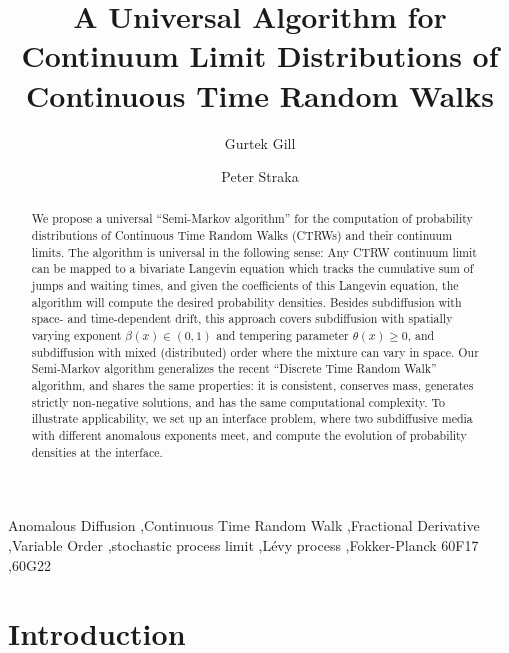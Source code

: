 \documentclass[a4paper,12pt]{elsarticle}
\numberwithin{equation}{section}
\theoremstyle{plain}
\theoremstyle{definition}
\theoremstyle{remark}
\numberwithin{equation}{section}
\newcommand{\1}{\mathbf 1}
\begin{document}
\begin{frontmatter}

\title{A Universal Algorithm for Continuum Limit Distributions of
Continuous Time Random Walks}
\author[UNSW]{Gurtek Gill}
\author[UNSW]{Peter Straka}
\address[UNSW]{School of Mathematics \& Statistics, UNSW Sydney}

\begin{abstract}
We propose a universal ``Semi-Markov algorithm'' for the computation of
probability distributions of Continuous Time Random Walks (CTRWs) and their
continuum limits.
The algorithm is universal in the following sense: Any CTRW continuum limit
can be mapped to a bivariate Langevin equation which tracks the cumulative sum
of jumps and waiting times, and given the coefficients of this Langevin
equation, the algorithm will compute the desired probability densities.
Besides subdiffusion with space- and time-dependent drift, this approach
covers subdiffusion with spatially varying exponent $\beta(x) \in (0,1)$ and
tempering parameter $\theta(x) \ge 0$, and subdiffusion with mixed (distributed)
order where the mixture can vary in space.
Our Semi-Markov algorithm generalizes the recent
``Discrete Time Random Walk'' algorithm, and shares the same properties:
it is consistent, conserves mass, generates strictly non-negative solutions,
and has the same computational complexity.
To illustrate applicability, we set up an interface problem, where two
subdiffusive media with different anomalous exponents meet, and compute the
evolution of probability densities at the interface. 
\end{abstract}

\begin{keyword}
Anomalous Diffusion \sep Continuous Time Random Walk \sep Fractional Derivative \sep Variable Order \sep stochastic process limit \sep L\'evy process \sep Fokker-Planck
\MSC[2010] 60F17 \sep  60G22
\end{keyword}

\end{frontmatter}

\section{Introduction}
\end{document}

